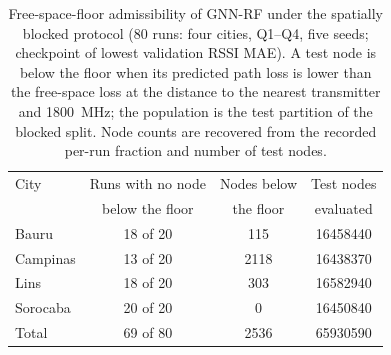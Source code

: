 \begin{table}[!t]
\centering
\caption{Free-space-floor admissibility of GNN-RF under the spatially blocked protocol (80 runs: four cities, Q1--Q4, five seeds; checkpoint of lowest validation RSSI MAE). A test node is below the floor when its predicted path loss is lower than the free-space loss at the distance to the nearest transmitter and 1800~MHz; the population is the test partition of the blocked split. Node counts are recovered from the recorded per-run fraction and number of test nodes.}
\label{tab:physics_compliance}
\setlength{\tabcolsep}{4pt}
\begin{tabular}{lccc}
\toprule
City & Runs with no node & Nodes below & Test nodes \\
 & below the floor & the floor & evaluated \\
\midrule
Bauru & 18 of 20 & \num{115} & \num{16458440} \\
Campinas & 13 of 20 & \num{2118} & \num{16438370} \\
Lins & 18 of 20 & \num{303} & \num{16582940} \\
Sorocaba & 20 of 20 & \num{0} & \num{16450840} \\
\midrule
Total & 69 of 80 & \num{2536} & \num{65930590} \\
\bottomrule
\end{tabular}
\end{table}
